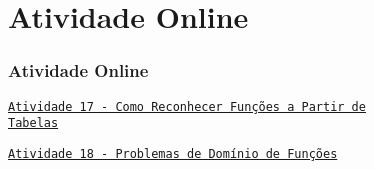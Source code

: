 \section{Atividade Online}
\begin{frame}
\frametitle{Atividade Online} 

\href{https://pt.khanacademy.org/math/algebra-home/alg-functions/alg-recognizing-functions-ddp/e/recognizing_functions}
{{\tt Atividade 17 - Como Reconhecer Funções a Partir de\\ Tabelas}}

\href{https://pt.khanacademy.org/math/algebra/x2f8bb11595b61c86:functions/x2f8bb11595b61c86:determining-the-domain-of-a-function/e/interpreting-domain}
{{\tt Atividade 18 - Problemas de Domínio de Funções}}


\end{frame}
